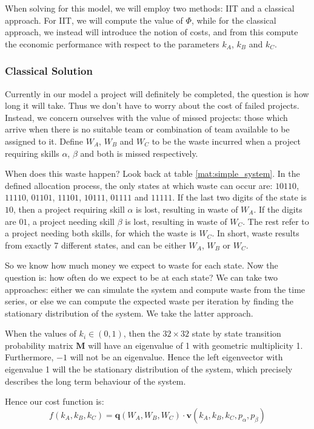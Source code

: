 When solving for this model, we will employ two methods: IIT and a classical approach. For IIT, we will compute the value of $\Phi$, while for the classical approach, we instead will introduce the notion of costs, and from this compute the economic performance with respect to the parameters $k_A$, $k_B$ and $k_C$. 

\subsubsection{Classical Solution}
Currently in our model a project will definitely be completed, the question is how long it will take. Thus we don't have to worry about the cost of failed projects. Instead, we concern ourselves with the value of missed projects: those which arrive when there is no suitable team or combination of team available to be assigned to it. Define $W_A$, $W_B$ and $W_C$ to be the waste incurred when a project requiring skills $\alpha$, $\beta$ and both  is missed respectively.

When does this waste happen? Look back at table \ref{mat:simple_system}. In the defined allocation process, the only states at which waste can occur are: $10110$, $11110$, $01101$, $11101$, $10111$, $01111$ and $11111$. If the last two digits of the state is $10$, then a project requiring skill $\alpha$ is lost, resulting in waste of $W_A$. If the digits are $01$, a project needing skill $\beta$ is lost, resulting in waste of $W_C$. The rest refer to a project needing both skills, for which the waste is $W_C$. In short, waste results from exactly 7 different states, and can be either $W_A$, $W_B$ or $W_C$.

So we know how much money we expect to waste for each state. Now the question is: how often do we expect to be at each state? We can take two approaches: either we can simulate the system and compute waste from the time series, or else we can compute the expected waste per iteration by finding the stationary distribution of the system. We take the latter approach.

When the values of $k_i \in (0,1)$, then the $32\times32$ state by state transition probability matrix $\mathbf{M}$ will have an eigenvalue of 1 with geometric multiplicity 1. Furthermore, $-1$ will not be an eigenvalue. Hence the left eigenvector with eigenvalue 1 will the be stationary distribution of the system, which precisely describes the long term behaviour of the system. 

Hence our cost function is:
\begin{equation}
\label{eq:simple_model_cost_function}
f(k_A, k_B, k_C) = \mathbf{q}(W_A, W_B, W_C) \cdot \mathbf{v}(k_A, k_B, k_C, p_\alpha, p_\beta)
\end{equation}

